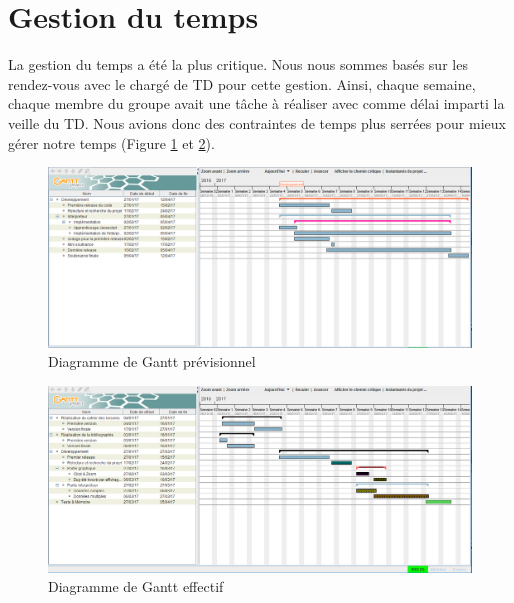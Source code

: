 \section{Gestion du temps}%

La gestion du temps a été la plus critique. Nous nous sommes basés sur les rendez-vous avec le chargé de TD pour cette gestion. Ainsi, chaque semaine, chaque membre du groupe avait une tâche à réaliser avec comme délai imparti la veille du TD. Nous avions donc des contraintes de temps plus serrées pour mieux gérer notre temps (Figure \ref{fig:Diag-prév} et \ref{fig:Diag-effec}).


\begin{figure}[H]
  \centering
    \includegraphics[width=1\textwidth]{images/gantt_previsionnel.png}
        \caption{Diagramme de Gantt prévisionnel}
        \label{fig:Diag-prév}
\end{figure}


\begin{figure}[H]
  \centering
    \includegraphics[width=1\textwidth]{images/gantt_effectif.png}
        \caption{Diagramme de Gantt effectif}
        \label{fig:Diag-effec}
\end{figure}

